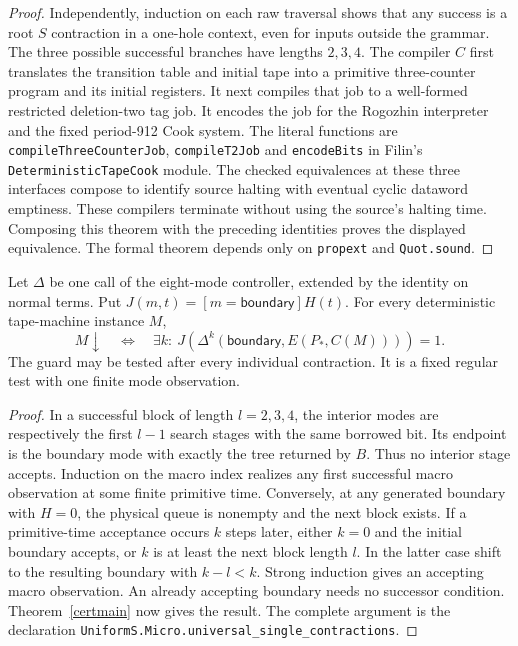 \begin{proof}
Independently, induction on each raw traversal shows that any success is a root \(S\) contraction in a one-hole context, even for inputs outside the grammar. The three possible successful branches have lengths \(2,3,4\). The compiler \(C\) first translates the transition table and initial tape into a primitive three-counter program and its initial registers. It next compiles that job to a well-formed restricted deletion-two tag job. It encodes the job for the Rogozhin interpreter and the fixed period-912 Cook system. The literal functions are \texttt{compileThreeCounterJob}, \texttt{compileT2Job} and \texttt{encodeBits} in Filin's \texttt{DeterministicTapeCook} module. The checked equivalences at these three interfaces compose to identify source halting with eventual cyclic dataword emptiness. These compilers terminate without using the source's halting time. Composing this theorem with the preceding identities proves the displayed equivalence. The formal theorem depends only on \texttt{propext} and \texttt{Quot.sound}.
\end{proof}

\begin{theorem}\label{microhalt}
Let \(\Delta\) be one call of the eight-mode controller, extended by the identity on normal terms. Put \(J(m,t)=[m=\mathsf{boundary}]H(t)\). For every deterministic tape-machine instance \(M\),
\[
 M\downarrow\quad\Longleftrightarrow\quad
 \exists k:\ J\!\left(\Delta^k(\mathsf{boundary},E(P_*,C(M)))\right)=1 .
\]
The guard may be tested after every individual contraction. It is a fixed regular test with one finite mode observation.
\end{theorem}
\begin{proof}
In a successful block of length \(l=2,3,4\), the interior modes are respectively the first \(l-1\) search stages with the same borrowed bit. Its endpoint is the boundary mode with exactly the tree returned by \(B\). Thus no interior stage accepts. Induction on the macro index realizes any first successful macro observation at some finite primitive time. Conversely, at any generated boundary with \(H=0\), the physical queue is nonempty and the next block exists. If a primitive-time acceptance occurs \(k\) steps later, either \(k=0\) and the initial boundary accepts, or \(k\) is at least the next block length \(l\). In the latter case shift to the resulting boundary with \(k-l<k\). Strong induction gives an accepting macro observation. An already accepting boundary needs no successor condition. Theorem~\ref{certmain} now gives the result. The complete argument is the declaration \texttt{UniformS.Micro.universal\_single\_contractions}.
\end{proof}

